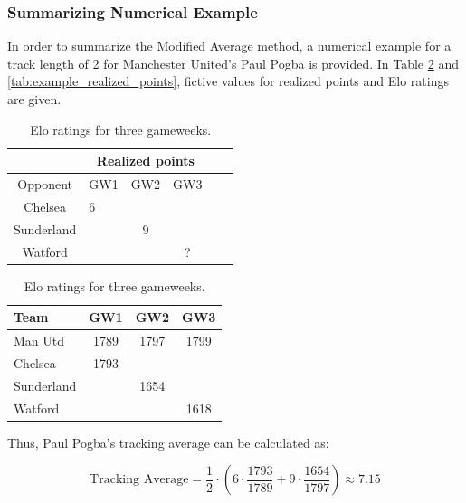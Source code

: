 \subsubsection{Summarizing Numerical Example}

In order to summarize the Modified Average method, a numerical example for a track length of 2 for Manchester United's Paul Pogba is provided. In Table \ref{tab:example_elo_ratings} and \ref{tab:example_realized_points}, fictive values for realized points and Elo ratings are given. 

\begin{table}[H]
\parbox{.45\linewidth}{
\centering
\begin{tabular}{|c|l|c|c|c|c|}
\hline
\multicolumn{1}{|c|}{} & \multicolumn{3}{c|}{Realized points} \\ \hline
Opponent       & GW1        & GW2       & GW3       \\
\hline                 
Chelsea  \Tstrut            & 6         &           &           \\
Sunderland             &           & 9         &           \\
Watford  \Bstrut         &           &           &  ?        \\
\hline
\end{tabular}
\caption{Realized points for Paul Pogba.}
\label{tab:example_realized_points}
}
\hfill
\parbox{.45\linewidth}{
\centering
\begin{tabular}{|l|c|c|c|}
\hline
Team        & GW1   & GW2   & GW3  \\ 
\hline
Man Utd  \Tstrut    & 1789  & 1797  & 1799  \\
Chelsea     & 1793  &       &       \\
Sunderland  &       & 1654  &       \\
Watford  \Bstrut    &       &       & 1618 \\ \hline
\end{tabular}
\caption{Elo ratings for three gameweeks.}
\label{tab:example_elo_ratings}
}

\end{table}

Thus, Paul Pogba's tracking average can be calculated as:

\begin{equation*}
    \textrm{Tracking Average} = \frac{1}{2} \cdot (6 \cdot \frac{1793}{1789} + 9 \cdot \frac{1654}{1797}) \approx 7.15
\end{equation*}


